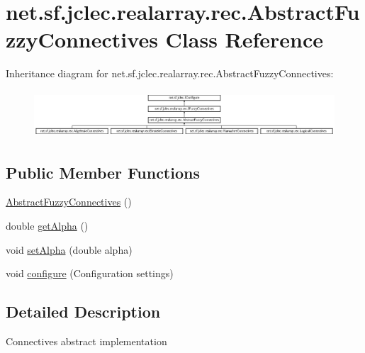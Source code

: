 \hypertarget{classnet_1_1sf_1_1jclec_1_1realarray_1_1rec_1_1_abstract_fuzzy_connectives}{\section{net.\-sf.\-jclec.\-realarray.\-rec.\-Abstract\-Fuzzy\-Connectives Class Reference}
\label{classnet_1_1sf_1_1jclec_1_1realarray_1_1rec_1_1_abstract_fuzzy_connectives}
}
Inheritance diagram for net.\-sf.\-jclec.\-realarray.\-rec.\-Abstract\-Fuzzy\-Connectives\-:\begin{figure}[H]
\begin{center}
\leavevmode
\includegraphics[height=1.766562cm]{classnet_1_1sf_1_1jclec_1_1realarray_1_1rec_1_1_abstract_fuzzy_connectives}
\end{center}
\end{figure}
\subsection*{Public Member Functions}
\begin{DoxyCompactItemize}
\item 
\hyperlink{classnet_1_1sf_1_1jclec_1_1realarray_1_1rec_1_1_abstract_fuzzy_connectives_ad4297b3bf30901127009d31637bfae1f}{Abstract\-Fuzzy\-Connectives} ()
\item 
double \hyperlink{classnet_1_1sf_1_1jclec_1_1realarray_1_1rec_1_1_abstract_fuzzy_connectives_aff5d878d9ceec7f839468d1cb716dfec}{get\-Alpha} ()
\item 
void \hyperlink{classnet_1_1sf_1_1jclec_1_1realarray_1_1rec_1_1_abstract_fuzzy_connectives_a45e699498fb9c6009e8ea066837862cc}{set\-Alpha} (double alpha)
\item 
void \hyperlink{classnet_1_1sf_1_1jclec_1_1realarray_1_1rec_1_1_abstract_fuzzy_connectives_a35538e69d56a5f2f01bdb8d485551165}{configure} (Configuration settings)
\end{DoxyCompactItemize}


\subsection{Detailed Description}
Connectives abstract implementation

